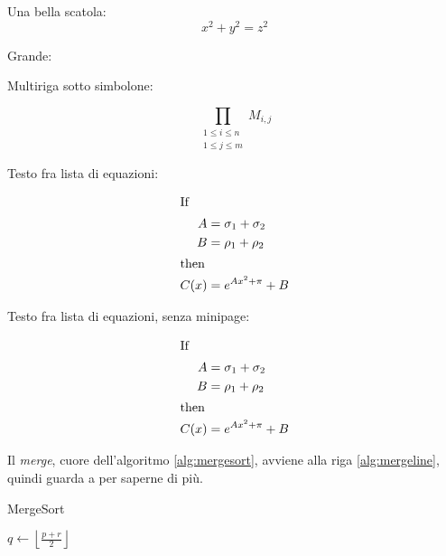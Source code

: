 Una bella scatola:
\begin{equation}
    \boxed{x^2+y^2 = z^2}
\end{equation}

Grande:


Multiriga sotto simbolone:

\begin{equation}
  \prod_{\substack{
            1\le i \le n\\
            1\le j \le m}}
     M_{i,j}
\end{equation}

Testo fra lista di equazioni:

\begin{minipage}{3in}
\begin{align*}
\intertext{If}
   A &= \sigma_1+\sigma_2\\
   B &= \rho_1+\rho_2\\
\intertext{then}
C(x) &= e^{Ax^2+\pi}+B
\end{align*} 
\end{minipage}


Testo fra lista di equazioni, senza minipage:

\begin{align*}
\intertext{If}
   A &= \sigma_1+\sigma_2\\
   B &= \rho_1+\rho_2\\
\intertext{then}
C(x) &= e^{Ax^2+\pi}+B
\end{align*} 

Il \textit{merge}, cuore dell'algoritmo \ref{alg:mergesort}, avviene alla riga \ref{alg:mergeline}, quindi guarda a  per saperne di più.

\begin{algorithm}[h]
\caption{MergeSort}\label{alg:mergesort}
\begin{algorithmic}[1]
        \State $ q \gets \left\lfloor \frac{p+r}{2} \right\rfloor $ 
        \State {} 
        \State {} 
        \State
            \label{alg:mergeline}
    \EndIf
    \EndProcedure
\end{algorithmic}
\end{algorithm}

